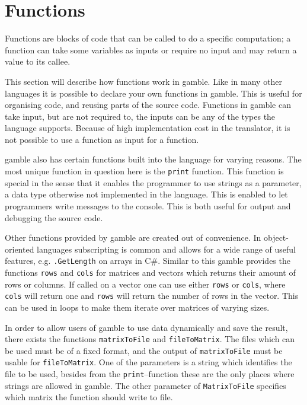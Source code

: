 \section{Functions}\label{sec:funcs}
Functions are blocks of code that can be called to do a specific computation; a function can take some variables as inputs or require no input and may return a value to its callee.

This section will describe how functions work in \gls{gamble}.
Like in many other languages it is possible to declare your own functions in \gls{gamble}.
This is useful for organising code, and reusing parts of the source code.
Functions in \gls{gamble} can take input, but are not required to, the inputs can be any of the types the language supports.
Because of high implementation cost in the translator, it is not possible to use a function as input for a function.

\gls{gamble} also has certain functions built into the language for varying reasons.
The most unique function in question here is the \texttt{print} function.
This function is special in the sense that it enables the programmer to use strings as a parameter, a data type otherwise not implemented in the language.
This is enabled to let programmers write messages to the console.
This is both useful for output and debugging the source code.

Other functions provided by \gls{gamble} are created out of convenience.
In object-oriented languages subscripting is common and allows for a wide range of useful features, e.g. \texttt{.GetLength} on arrays in C\#.
Similar to this \gls{gamble} provides the functions \texttt{rows} and \texttt{cols} for matrices and vectors which returns their amount of rows or columns.
If called on a vector one can use either \texttt{rows} or \texttt{cols}, where \texttt{cols} will return one and \texttt{rows} will return the number of rows in the vector.
This can be used in loops to make them iterate over matrices of varying sizes.

In order to allow users of \gls{gamble} to use data dynamically and save the result, there exists the functions \texttt{matrixToFile} and \texttt{fileToMatrix}. 
The files which can be used must be of a fixed format, and the output of \texttt{matrixToFile} must be usable for \texttt{fileToMatrix}.
One of the parameters is a string which identifies the file to be used, besides from the \texttt{print}--function these are the only places where strings are allowed in \gls{gamble}.
The other parameter of \texttt{MatrixToFile} specifies which matrix the function should write to file.

